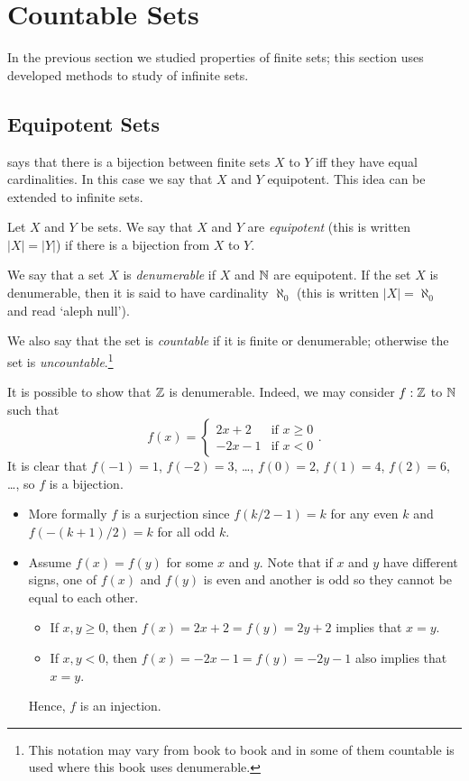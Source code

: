 \chapter{Countable Sets}
In the previous section we studied properties of finite sets; this section
uses developed methods to study of infinite sets.

\section{Equipotent Sets}

 says that there is a bijection between
finite sets $X$ to $Y$ iff they have equal cardinalities. In this case we say
that $X$ and $Y$ equipotent.
This idea can be extended to infinite sets.
\begin{definition}
  Let $X$ and $Y$ be sets. We say that $X$ and $Y$ are \emph{equipotent} (this
  is written $|X| = |Y|$) if there is a bijection from $X$ to $Y$.

  We say that a set $X$ is \emph{denumerable} if $X$ and ${\mathbb{N}}$ are equipotent.
  If the set $X$ is denumerable, then it is said to have cardinality $\aleph_0$
  (this is written $|X| = \aleph_0$ and read `aleph null').

  We also say that the set is \emph{countable} if it is finite or denumerable;
  otherwise the set is \emph{uncountable}.\footnote{%
    This notation may vary from book to book and in some of them countable is
    used where this book uses denumerable.
  }
\end{definition}

It is possible to show that ${\mathbb{Z}}$ is denumerable. Indeed, we may consider $f :
{\mathbb{Z}}$ to ${\mathbb{N}}$ such that 
\[
  f(x) = 
  \begin{cases}
    2x + 2 & \text{if } x \ge 0 \\
    -2x - 1 & \text{if } x < 0
  \end{cases}.
\]
It is clear that $f(-1) = 1$, $f(-2) = 3$, \dots, $f(0) = 2$, $f(1) = 4$, $f(2)
= 6$, \dots, so $f$ is a bijection.
\begin{itemize}
  \item More formally $f$ is a surjection since $f(k / 2 - 1) = k$ for any even
    $k$ and $f(-(k + 1) / 2) = k$ for all odd $k$.
  \item Assume $f(x) = f(y)$ for some $x$ and $y$. Note that if $x$ and
    $y$ have different signs, one of $f(x)$ and $f(y)$ is even and another is
    odd so they cannot be equal to each other.
    \begin{itemize}
      \item If $x, y \ge 0$, then $f(x) = 2x + 2 = f(y) = 2y + 2$ implies that
        $x = y$.
      \item If $x, y < 0$, then $f(x) = -2x - 1= f(y) = -2y - 1$ also implies
        that $x = y$.
    \end{itemize}
    Hence, $f$ is an injection.
\end{itemize}

